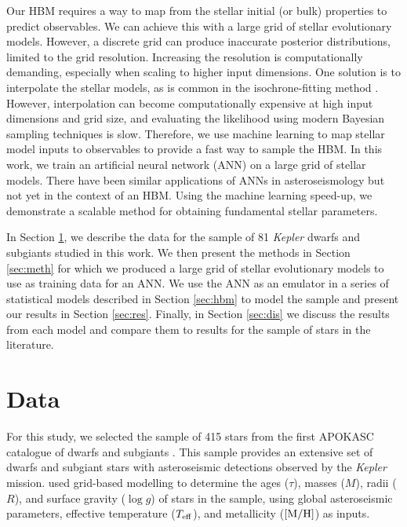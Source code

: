 Our HBM requires a way to map from the stellar initial (or bulk) properties to predict observables. We can achieve this with a large grid of stellar evolutionary models. However, a discrete grid can produce inaccurate posterior distributions, limited to the grid resolution. Increasing the resolution is computationally demanding, especially when scaling to higher input dimensions. One solution is to interpolate the stellar models, as is common in the isochrone-fitting method \citep[see e.g.][]{Berger.Huber.ea2020}. However, interpolation can become computationally expensive at high input dimensions and grid size, and evaluating the likelihood using modern Bayesian sampling techniques is slow. Therefore, we use machine learning to map stellar model inputs to observables to provide a fast way to sample the HBM. In this work, we train an artificial neural network (ANN) on a large grid of stellar models. There have been similar applications of ANNs in asteroseismology \citep{Verma.Hanasoge.ea2016, Bellinger.Angelou.ea2016, Hon.Stello.ea2017, Hon.Stello.ea2018a, Hendriks.Aerts2019} but not yet in the context of an HBM. Using the machine learning speed-up, we demonstrate a scalable method for obtaining fundamental stellar parameters.

In Section \ref{sec:data}, we describe the data for the sample of 81 \emph{Kepler} dwarfs and subgiants studied in this work. We then present the methods in Section \ref{sec:meth} for which we produced a large grid of stellar evolutionary models to use as training data for an ANN. We use the ANN as an emulator in a series of statistical models described in Section \ref{sec:hbm} to model the sample and present our results in Section \ref{sec:res}. Finally, in Section \ref{sec:dis} we discuss the results from each model and compare them to results for the sample of stars in the literature.

\section{Data}\label{sec:data}



For this study, we selected the sample of 415 stars from the first APOKASC catalogue of dwarfs and subgiants \citep[][hereafter \serenelli]{Serenelli.Johnson.ea2017}. This sample provides an extensive set of dwarfs and subgiant stars with asteroseismic detections observed by the \emph{Kepler} mission.  used grid-based modelling to determine the ages ($\tau$), masses ($M$), radii ($R$), and surface gravity ($\log g$) of stars in the sample, using global asteroseismic parameters, effective temperature (${T_\mathrm{eff}}$), and metallicity ($[\mathrm{M}/\mathrm{H}]$) as inputs.

